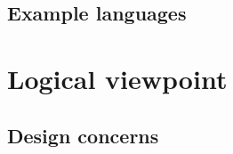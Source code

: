 		\subsection{Example languages} \label{s:template-vpv:example-languages}
			\begin{comment}
				UML component diagrams (see OMG [B28]) cover this viewpoint. The simplest graphical technique used
				to describe functional system decomposition is a hierarchical decomposition diagram; such diagram can be
				used together with natural language descriptions of purpose and function for each entity, such as is
				provided by IDEF0 (IEEE Std 1320.1-1998 [B18]), the Structure Chart (Yourdon and Constantine [B38],
				and the HIPO Diagram. Run-time composition can also use structured diagrams (Page-Jones [B29]).
			\end{comment}
		
	\section{Logical viewpoint} \label{s:template-vpv:logiacl-viewpoint}
		\begin{comment}
			The purpose of the Logical viewpoint is to elaborate existing and designed types and their implementations
			as classes and interfaces with their structural static relationships. This viewpoint also uses examples of
			instances of types in outlining design ideas.
		\end{comment}
		
		\subsection{Design concerns} \label{s:template-vpv:design-concerns}
			\begin{comment}
				The Logical viewpoint is used to address the development and reuse of adequate abstractions and their
				implementations. For any implementation platform, a set of types is readily available for the domain
				abstractions of interest in a design subject, and a number of new types is to be designed, some of which
				may be considered for reuse. The main concern is the proper choice of abstractions and their expression in
				terms of existing types (some of which may had been specific to the design subject).
			\end{comment}
			
